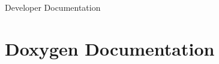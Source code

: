\documentclass[a4paper, fontsize=10pt, twoside, openright, BCOR1cm]{scrbook}
\newcommand{\clearemptydoublepage}{%
  \newpage{\pagestyle{empty}\cleardoublepage}%
}
\newcommand{\+}{\discretionary{\mbox{\scriptsize$\hookleftarrow$}}{}{}}
\begin{document}
\begin{titlepage}
\vspace*{7cm}
\begin{center}%
{\Large \brickos Developer Documentation}\\
\end{center}
\end{titlepage}
\clearemptydoublepage
{}
\tableofcontents
\clearemptydoublepage
{}
\hypersetup{pageanchor=true}








\chapter{Doxygen Documentation}

\end{document}
